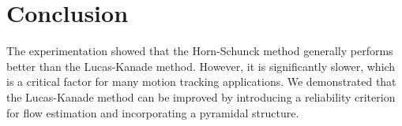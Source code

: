 \documentclass[9pt]{IEEEtran}
\begin{document}
\section{Conclusion}

The experimentation showed that the Horn-Schunck method generally performs better than the Lucas-Kanade
 method. However, it is significantly slower, which is a critical factor for many motion tracking 
 applications. We demonstrated that the Lucas-Kanade method can be improved by introducing a reliability 
 criterion for flow estimation and incorporating a pyramidal structure.



\end{document}
